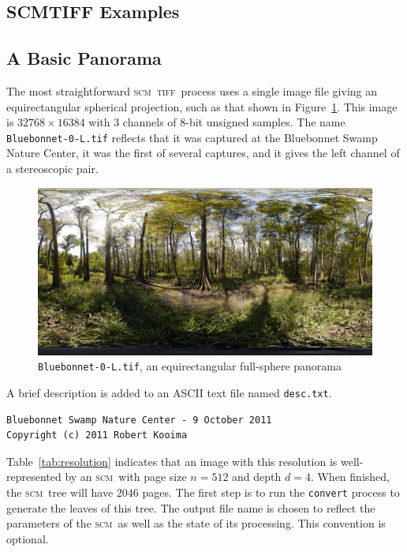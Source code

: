 \documentclass[oneside,10pt]{memoir}
\newcommand{\scm}     {\textsc{scm}}
\newcommand{\tiff}    {\textsc{tiff}}
\begin{document}
\begin{Spacing}{1.1}
\section{SCMTIFF Examples}

\subsection{A Basic Panorama}
\label{sec:panorama}

The most straightforward \scm\ \tiff\ process uses a single image file giving an equirectangular spherical projection, such as that shown in Figure~\ref{fig:bluebonnet}. This image is $\num{32768}\times\num{16384}$ with 3 channels of 8-bit unsigned samples. The name \texttt{Bluebonnet-0-L.tif} reflects that it was captured at the Bluebonnet Swamp Nature Center, it was the first of several captures, and it gives the left channel of a stereoscopic pair.

\begin{figure}
  \centering
  \includegraphics[width=\textwidth]{fig/bluebonnet.png}
  \caption{\texttt{Bluebonnet-0-L.tif}, an equirectangular full-sphere panorama}
  \label{fig:bluebonnet}
\end{figure}

A brief description is added to an ASCII text file named \texttt{desc.txt}.

\begin{Verbatim}
Bluebonnet Swamp Nature Center - 9 October 2011
Copyright (c) 2011 Robert Kooima
\end{Verbatim}

Table~\ref{tab:resolution} indicates that an image with this resolution is well-represented by an \scm\ with page size $n=512$ and depth $d=4$. When finished, the \scm\ tree will have $2046$ pages. The first step is to run the \texttt{convert} process to generate the leaves of this tree. The output file name is chosen to reflect the parameters of the \scm\ as well as the state of its processing. This convention is optional.


\end{Spacing}
\end{document}
